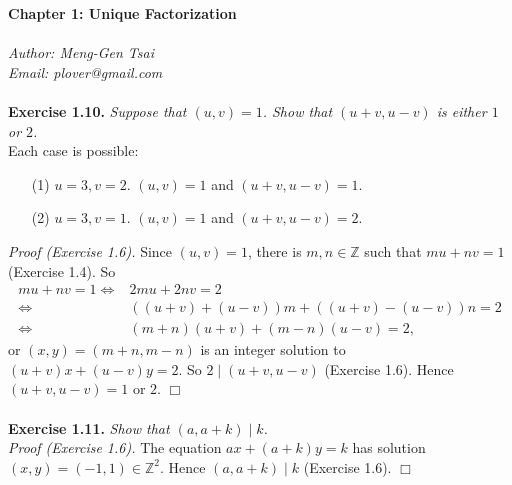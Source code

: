 \documentclass{article}
\begin{document}
\textbf{\Large Chapter 1: Unique Factorization} \\\\



\emph{Author: Meng-Gen Tsai} \\
\emph{Email: plover@gmail.com} \\\\






\textbf{Exercise 1.10.}
\emph{Suppose that $(u,v)=1$.
Show that $(u+v,u-v)$ is either $1$ or $2$.} \\

Each case is possible:
\begin{enumerate}
  \item[(1)]
  $u=3, v=2$. $(u,v)=1$ and $(u+v,u-v)=1$.
  \item[(2)]
  $u=3, v=1$. $(u,v)=1$ and $(u+v,u-v)=2$. \\
\end{enumerate}

\emph{Proof (Exercise 1.6).}
Since $(u,v)=1$, there is $m, n \in \mathbb{Z}$ such that $mu+nv=1$ (Exercise 1.4).
So
\begin{align*}
mu+nv=1
\Longleftrightarrow& 2mu+2nv=2 \\
\Longleftrightarrow& ((u+v) + (u-v))m + ((u+v)-(u-v))n = 2 \\
\Longleftrightarrow& (m+n)(u+v) + (m-n)(u-v) = 2,
\end{align*}
or $(x,y)=(m+n,m-n)$ is an integer solution to $(u+v)x + (u-v)y = 2$.
So $2 \mid (u+v, u-v)$ (Exercise 1.6).
Hence $(u+v, u-v) = 1$ or $2$.
$\Box$ \\\\






\textbf{Exercise 1.11.}
\emph{Show that $(a,a+k) \mid k$.} \\

\emph{Proof (Exercise 1.6).}
The equation $ax + (a+k)y = k$ has solution $(x,y) = (-1,1) \in \mathbb{Z}^2$.
Hence $(a,a+k) \mid k$ (Exercise 1.6).
$\Box$ \\\\
\end{document}
